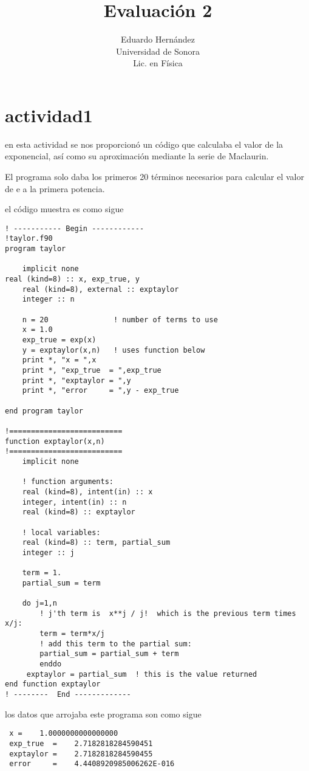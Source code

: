 \documentclass{article}
\title{Evaluación 2}
\author{Eduardo Hernández\\Universidad de Sonora\\Lic. en Física}
\begin{document}
\maketitle
\section{actividad1}
en esta actividad se nos proporcionó un código que calculaba el valor de la exponencial, así como su aproximación mediante la serie de Maclaurin.

El programa solo daba los primeros 20 términos necesarios para calcular el valor de e a la primera potencia.

el código muestra es como sigue
\begin{verbatim}
! ----------- Begin ------------
!taylor.f90
program taylor

    implicit none                  
real (kind=8) :: x, exp_true, y
    real (kind=8), external :: exptaylor
    integer :: n

    n = 20               ! number of terms to use
    x = 1.0
    exp_true = exp(x)
    y = exptaylor(x,n)   ! uses function below
    print *, "x = ",x
    print *, "exp_true  = ",exp_true
    print *, "exptaylor = ",y
    print *, "error     = ",y - exp_true

end program taylor

!==========================
function exptaylor(x,n)
!==========================
    implicit none

    ! function arguments:
    real (kind=8), intent(in) :: x
    integer, intent(in) :: n
    real (kind=8) :: exptaylor

    ! local variables:
    real (kind=8) :: term, partial_sum
    integer :: j

    term = 1.
    partial_sum = term

    do j=1,n
        ! j'th term is  x**j / j!  which is the previous term times x/j:
        term = term*x/j   
        ! add this term to the partial sum:
        partial_sum = partial_sum + term   
        enddo
     exptaylor = partial_sum  ! this is the value returned
end function exptaylor
! --------  End -------------
\end{verbatim}

los datos que arrojaba este programa son como sigue
\begin{verbatim}
 x =    1.0000000000000000     
 exp_true  =    2.7182818284590451     
 exptaylor =    2.7182818284590455     
 error     =    4.4408920985006262E-016
\end{verbatim}
\end{document}
